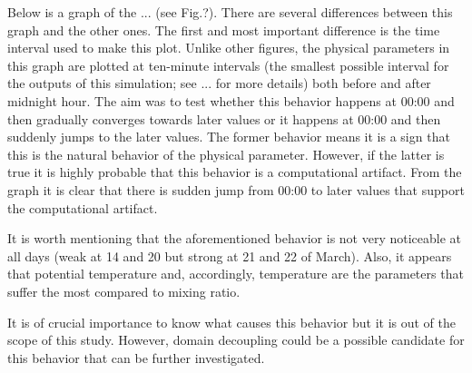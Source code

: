 \documentclass[a4paper,12pt]{article}
\numberwithin{equation}{section} %
\begin{document}
Below is a graph of the ... (see Fig.?). There are several differences between this graph and the other ones. The first and most important difference is the time interval used to make this plot. Unlike other figures, the physical parameters in this graph are plotted at ten-minute intervals (the smallest possible interval for the outputs of this simulation; see ... for more details) both before and after midnight hour. The aim was to test whether this behavior happens at 00:00 and then gradually converges towards later values or it happens at 00:00 and then suddenly jumps to the later values. The former behavior means it is a sign that this is the natural behavior of the physical parameter. However, if the latter is true it is highly probable that this behavior is a computational artifact. From the graph it is clear that there is sudden jump from 00:00 to later values that support the computational artifact.

It is worth mentioning that the aforementioned behavior is not very noticeable at all days (weak at 14 and 20 but strong at 21 and 22 of March). Also, it appears that potential temperature and, accordingly, temperature are the parameters that suffer the most compared to mixing ratio.

It is of crucial importance to know what causes this behavior but it is out of the scope of this study. However, domain decoupling could be a possible candidate for this behavior that can be further investigated.



\end{document}
